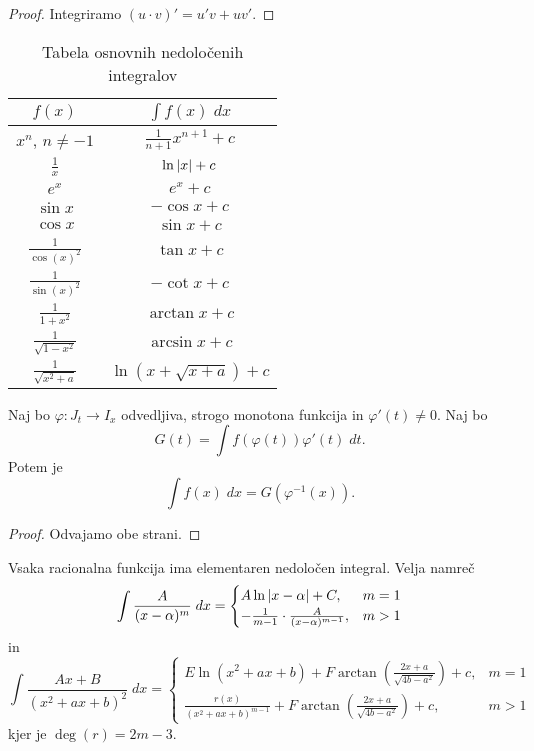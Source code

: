 \documentclass[12pt, a4paper]{article}
\begin{document}
\begin{proof}
Integriramo $(u\cdot v)'=u'v+uv'$.
\end{proof}

\begin{table}[!ht]
\centering
\caption{Tabela osnovnih nedoločenih integralov}
\begin{tabular}{c|c}
$f(x)$                   & $\displaystyle\int f(x)\;dx$ \\ \hline
$x^n$, $n\ne -1$         & $\frac{1}{n+1}x^{n+1}+c$     \\
$\frac{1}{x}$            & $\ln\left\lvert x\right\rvert+c$               \\
$e^x$                    & $e^x+c$                      \\
$\sin x$                 & $-\cos x+c$                  \\
$\cos x$                 & $\sin x + c$                 \\
$\frac{1}{\cos(x)^2}$    & $\tan x+c$                   \\
$\frac{1}{\sin(x)^2}$    & $-\cot x+c$                  \\
$\frac{1}{1+x^2}$        & $\arctan x+c$                \\
$\frac{1}{\sqrt{1-x^2}}$ & $\arcsin x+c$                \\
$\frac{1}{\sqrt{x^2+a}}$ & $\ln(x+\sqrt{x+a})+c$
\end{tabular}
\end{table}

\begin{trditev}
Naj bo $\varphi\colon J_t\to I_x$ odvedljiva, strogo monotona funkcija in $\varphi'(t)\ne 0$. Naj bo
\[
G(t) = \int f(\varphi(t))\varphi'(t)\;dt.
\]
Potem je
\[
\int f(x)\;dx = G(\varphi^{-1}(x)).
\]
\end{trditev}

\begin{proof}
Odvajamo obe strani.
\end{proof}

\begin{opomba}
Vsaka racionalna funkcija ima elementaren nedoločen integral. Velja namreč
\[
\int\frac{A}{(x-\alpha)^m}\;dx=\begin{cases}
A\ln\left\lvert x-\alpha\right\rvert+C, & m=1 \\
-\frac{1}{m-1}\cdot\frac{A}{(x-\alpha)^{m-1}}, & m>1
\end{cases}
\]
in
\[
\int \frac{Ax+B}{(x^2+ax+b)^2}\;dx = \begin{cases}
E\ln(x^2+ax+b)+F\arctan\left(\frac{2x+a}{\sqrt{4b-a^2}}\right)+c, & m=1 \\
\frac{r(x)}{(x^2+ax+b)^{m-1}}+F\arctan\left(\frac{2x+a}{\sqrt{4b-a^2}}\right)+c, & m>1
\end{cases}
\]
kjer je $\deg(r)=2m-3$.
\end{opomba}
\end{document}

